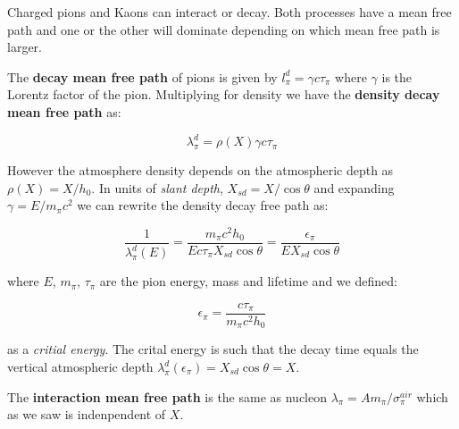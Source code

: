 \documentclass[
  letterpaper,
  DIV=11,
  numbers=noendperiod]{scrreprt}
\begin{document}
\begin{tcolorbox}[enhanced jigsaw, colframe=quarto-callout-note-color-frame, leftrule=.75mm, left=2mm, opacitybacktitle=0.6, colbacktitle=quarto-callout-note-color!10!white, coltitle=black, arc=.35mm, titlerule=0mm, toprule=.15mm, opacityback=0, bottomrule=.15mm, breakable, bottomtitle=1mm, rightrule=.15mm, toptitle=1mm, colback=white, title=\textcolor{quarto-callout-note-color}{\faInfo}\hspace{0.5em}{Mean free path for mesons, \(\pi\), \(K\)}]

Charged pions and Kaons can interact or decay. Both processes have a
mean free path and one or the other will dominate depending on which
mean free path is larger.

The \textbf{decay mean free path} of pions is given by
\(l^d_\pi =\gamma  c \tau_\pi\) where \(\gamma\) is the Lorentz factor
of the pion. Multiplying for density we have the \textbf{density decay
mean free path} as:

\[\lambda^d_\pi = \rho(X) \gamma  c \tau_\pi\]

However the atmosphere density depends on the atmospheric depth as
\(\rho(X) = X/h_0\). In units of \emph{slant depth},
\(X_{sd} = X/\cos\theta\) and expanding \(\gamma = E / m_\pi c^2\) we
can rewrite the density decay free path as:

\[\frac{1}{\lambda^d_\pi(E)} = \frac{m_\pi c^2 h_0}{E c \tau_\pi X_{sd} \cos \theta} = \frac{\epsilon_\pi}{E X_{sd} \cos\theta}\]

where \(E\), \(m_\pi\), \(\tau_\pi\) are the pion energy, mass and
lifetime and we defined:

\[\epsilon_\pi = \frac{c\tau_\pi}{m_\pi c^2 h_0}\]

as a \emph{critial energy}. The crital energy is such that the decay
time equals the vertical atmospheric depth
\(\lambda^d_\pi(\epsilon_\pi) = X_{sd} \cos\theta = X\).

The \textbf{interaction mean free path} is the same as nucleon
\(\lambda_\pi = A m_\pi/\sigma_\pi^{air}\) which as we saw is
indenpendent of \(X\).

\end{tcolorbox}
\end{document}
